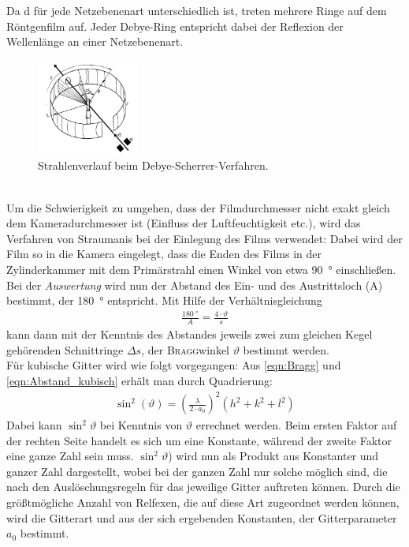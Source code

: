\documentclass[a4paper,twoside,final]{article}
\begin{document}
Da d für jede Netzebenenart unterschiedlich ist, treten mehrere Ringe auf dem Röntgenfilm auf. Jeder Debye-Ring entspricht dabei der Reflexion der Wellenlänge an einer Netzebenenart.
\begin{figure}[htp]
    \centering
    \includegraphics[width=0.3\textwidth]{Abbildungen/Debye-Sherrer-Kamera.pdf}
    \caption{Strahlenverlauf beim Debye-Scherrer-Verfahren.~\cite[S.375]{Kleber}}
    \label{fig:Debye-Kamera}
\end{figure}\\
Um die Schwierigkeit zu umgehen, dass der Filmdurchmesser nicht exakt gleich dem Kameradurchmesser ist (Einfluss der Luftfeuchtigkeit etc.), wird das Verfahren von Straumanis bei der Einlegung des Films verwendet: Dabei wird der Film so in die Kamera eingelegt, dass die Enden des Films in der Zylinderkammer mit dem Primärstrahl einen Winkel von etwa \SI{90}{\degree} einschließen.\\
Bei der \textit{Auswertung} wird nun der Abstand des Ein- und des Austrittsloch (A) bestimmt, der \SI{180}{\degree} entspricht. Mit Hilfe der Verhältnisgleichung
\begin{align}
  \frac{\SI{180}{\degree}}{A} = \frac{4\cdot \vartheta}{ s}\label{eqn:Verhältnisgleichung}
\end{align}
kann dann mit der Kenntnis des Abstandes jeweils zwei zum gleichen Kegel gehörenden Schnittringe $\Delta s$, der \textsc{Bragg}winkel $\vartheta$ bestimmt werden. \\
Für kubische Gitter wird wie folgt vorgegangen: Aus \eqref{eqn:Bragg} und \eqref{eqn:Abstand_kubisch} erhält man durch Quadrierung:
\begin{align}\label{equ:Auswertung}
  \sin^2(\vartheta) = \left(\frac{\lambda}{2\cdot a_0}\right)^2 (h^2+k^2+l^2)
\end{align}
Dabei kann $\sin^2\vartheta$ bei Kenntnis von $\vartheta$ errechnet werden. Beim ersten Faktor auf der rechten Seite handelt es sich um eine Konstante, während der zweite Faktor eine ganze Zahl sein muss. $\sin^2\vartheta$) wird nun als Produkt aus Konstanter und ganzer Zahl dargestellt, wobei bei der ganzen Zahl nur solche möglich sind, die nach den Auslöschungsregeln für das jeweilige Gitter auftreten können. Durch die größtmögliche Anzahl von Relfexen, die auf diese Art zugeordnet werden können, wird die Gitterart und aus der sich ergebenden Konstanten, der Gitterparameter $a_0$ bestimmt.
\end{document}

